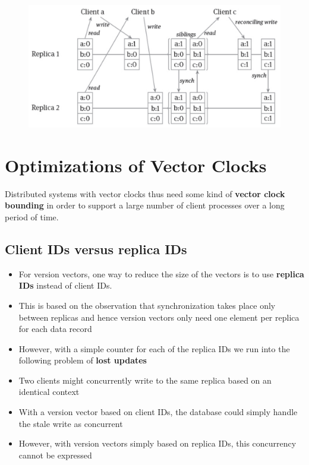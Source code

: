 \begin{figure}[h!]
\centering
\includegraphics[width=.7\linewidth]{images/AdvancedDataManagment/distribute_concurrency_control/version_vector-siblings.jpeg}
\end{figure}

\section{Optimizations of Vector Clocks}
Distributed systems with vector clocks thus need some kind of \textbf{vector clock bounding} in order to support a large number of client processes over a long period of time.

\subsection{Client IDs versus replica IDs}
\begin{itemize}
    \item For version vectors, one way to reduce the size of the vectors is to use \textbf{replica IDs} instead of client IDs.
    \item This is based on the observation that synchronization takes place only between replicas and hence version vectors only need one element per replica for each data record
    \item However, with a simple counter for each of the replica IDs we run into the following problem of \textbf{lost updates}
    \item Two clients might concurrently write to the same replica based on an identical context
    \item With a version vector based on client IDs, the database could simply handle the stale write as concurrent
    \item However, with version vectors simply based on replica IDs, this concurrency cannot be expressed
\end{itemize}


